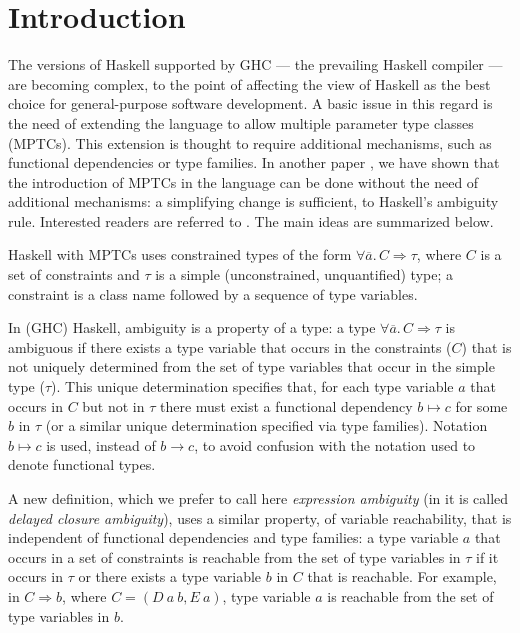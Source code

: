 \section{Introduction}
\label{sec:intro}

The versions of Haskell supported by GHC \cite{GHC} --- the prevailing
Haskell compiler --- are becoming complex, to the point of affecting
the view of Haskell as the best choice for general-purpose software
development. A basic issue in this regard is the need of extending the
language to allow multiple parameter type classes (MPTCs). This
extension is thought to require additional mechanisms, such as
functional dependencies or type families. In another paper
\cite{JBCS-Ambiguity-and-constrained-polymorphism}, we have shown that
the introduction of MPTCs in the language can be done without the need
of additional mechanisms: a simplifying change is sufficient, to
Haskell's ambiguity rule. Interested readers are referred to
\cite{JBCS-Ambiguity-and-constrained-polymorphism}. The main ideas are
summarized below.

Haskell with MPTCs uses constrained types of the form $\forall
\overline{a}.\,C \Rightarrow \tau$, where $C$ is a set of constraints
and $\tau$ is a simple (unconstrained, unquantified) type; a
constraint is a class name followed by a sequence of type variables.

In (GHC) Haskell, ambiguity is a property of a type: a type $\forall
\overline{a}.\,C \Rightarrow \tau$ is ambiguous if there exists a type
variable that occurs in the constraints ($C$) that is not uniquely
determined from the set of type variables that occur in the simple
type ($\tau$). This unique determination specifies that, for each type
variable $a$ that occurs in $C$ but not in $\tau$ there must exist a
functional dependency $b \mapsto c$ for some $b$ in $\tau$ (or a
similar unique determination specified via type families). Notation $b
\mapsto c$ is used, instead of $b \rightarrow c$, to avoid confusion
with the notation used to denote functional types.

A new definition, which we prefer to call here {\em expression
  ambiguity\/} (in \cite{JBCS-Ambiguity-and-constrained-polymorphism}
it is called {\em delayed closure ambiguity\/}), uses a similar
property, of variable reachability, that is independent of functional
dependencies and type families: a type variable $a$ that occurs in a
set of constraints is reachable from the set of type variables in
$\tau$ if it occurs in $\tau$ or there exists a type variable $b$ in
$C$ that is reachable. For example, in $C \Rightarrow b$, where
$C=(D\: a\: b, E\: a)$, type variable $a$ is reachable from the set of
type variables in $b$.

